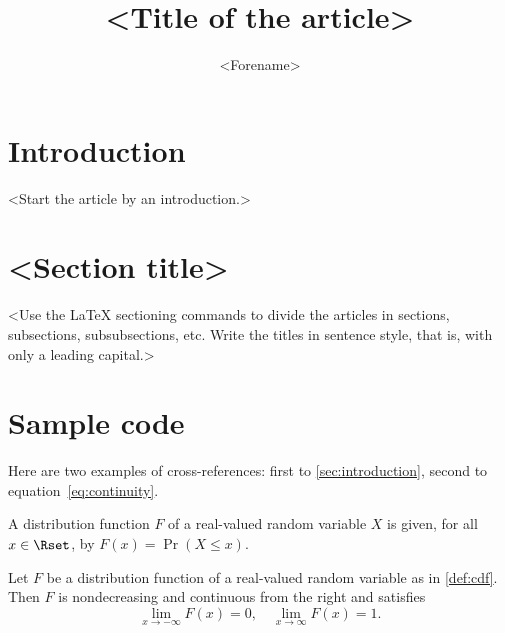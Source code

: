 \documentclass[french,english,review]{cjs-rcs-article}
\title{<Title of the article>}
\author[orcid=<id>, email=<email>, corresponding]
         {<Forename> \surname{<Surname>}}
\affil{<Department, University, City, Country>}
\begin{document}
\maketitle                      %

\section{Introduction}
\label{sec:introduction}        %

<Start the article by an introduction.>

\section{<Section title>}

<Use the LaTeX sectioning commands to divide the articles in sections,
subsections, subsubsections, etc. Write the titles in sentence style,
that is, with only a leading capital.>

\section{Sample code}

Here are two examples of cross-references: first to
\autoref{sec:introduction}, second to equation~\eqref{eq:continuity}.

\begin{definition}
  \label{def:cdf}
  A distribution function $F$ of a real-valued random variable $X$ is
  given, for all $x \in \Rset$, by $F(x) = \Pr(X \leq x)$.
\end{definition}

\begin{theorem}
  \label{thm:continuity}
  Let $F$ be a distribution function of a real-valued random variable
  as in \autoref{def:cdf}. Then $F$ is nondecreasing and continuous from
  the right and satisfies
  \begin{equation}
    \label{eq:continuity}
    \lim_{x \to -\infty} F(x) = 0, \quad \lim_{x \to \infty} F(x) = 1.
  \end{equation}
\end{theorem}
\end{document}

